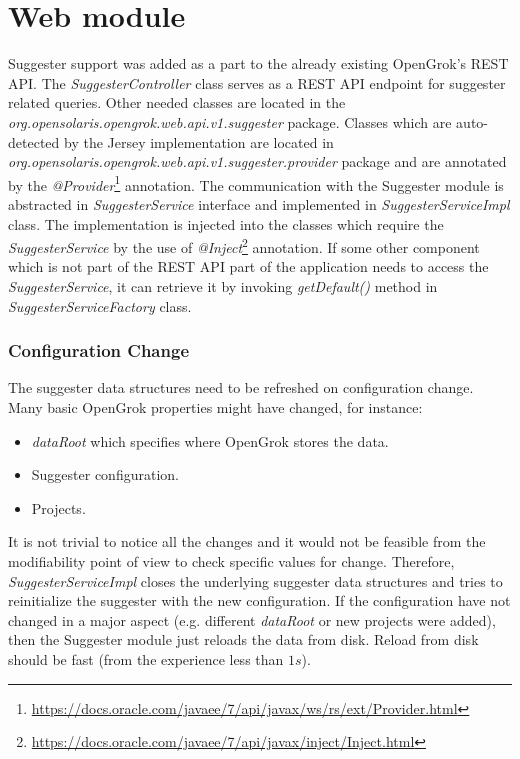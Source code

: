 \section{Web module}
Suggester support was added as a part to the already existing OpenGrok's REST API. The \textit{SuggesterController}
class serves as a REST API endpoint for suggester related queries. Other needed classes are located in the
\textit{org.opensolaris.opengrok.web.api.v1.suggester} package. Classes which are auto-detected by the Jersey
implementation are located in \textit{org.opensolaris.opengrok.web.api.v1.suggester.provider} package and are annotated
by the \textit{@Provider}\footnote{\url{https://docs.oracle.com/javaee/7/api/javax/ws/rs/ext/Provider.html}} annotation.
The communication with the Suggester module is abstracted in \textit{SuggesterService} interface and implemented in
\textit{SuggesterServiceImpl} class. The implementation is injected into the classes which require the
\textit{SuggesterService} by the use of
\textit{@Inject}\footnote{\url{https://docs.oracle.com/javaee/7/api/javax/inject/Inject.html}} annotation. If some other
component which is not part of the REST API part of the application needs to access the \textit{SuggesterService},
it can retrieve it by invoking \textit{getDefault()} method in \textit{SuggesterServiceFactory} class.

\subsubsection{Configuration Change}
The suggester data structures need to be refreshed on configuration change.
Many basic OpenGrok properties might have changed, for instance:
\begin{itemize}
    \item \textit{dataRoot} which specifies where OpenGrok stores the data.
    \item Suggester configuration.
    \item Projects.
\end{itemize}

It is not trivial to notice all the changes and it would not be feasible from the modifiability point of view to check
specific values for change. Therefore, \textit{SuggesterServiceImpl} closes the underlying suggester data structures
and tries to reinitialize the suggester with the new configuration. If the configuration have not changed in a major
aspect (e.g. different \textit{dataRoot} or new projects were added), then the Suggester module just reloads the data
from disk. Reload from disk should be fast (from the experience less than $1s$).

